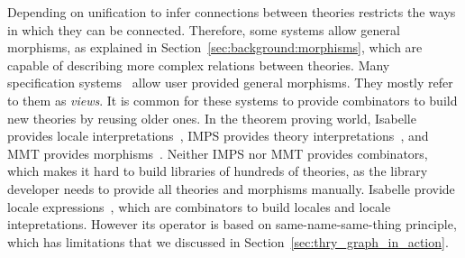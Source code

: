 Depending on unification to infer connections between theories restricts the ways in which they can be connected. 
Therefore, some systems allow general morphisms, as explained in Section~\ref{sec:background:morphisms}, which are capable of describing more complex relations between theories. Many specification systems~\cite{Goguen1980, CoFI:2004:CASL-RM, Smith99, duran2007maude} allow user provided general morphisms. They mostly refer to them as \emph{views}. It is common for these systems to provide combinators to build new theories by reusing older ones. In the theorem proving world, Isabelle provides locale interpretations~\cite{localeIntepretations2006}, IMPS provides theory interpretations~\cite{farmer1993imps}, and MMT provides morphisms~\cite{rabe2013scalable}. Neither IMPS nor MMT provides combinators, which makes it hard to build libraries of hundreds of theories, as the library developer needs to provide all theories and morphisms manually. Isabelle provide locale expressions~\cite{ballarin2003locales}, which are combinators to build locales and locale intepretations. However its  operator is based on same-name-same-thing principle, which has limitations that we discussed in Section~\ref{sec:thry_graph_in_action}. 





